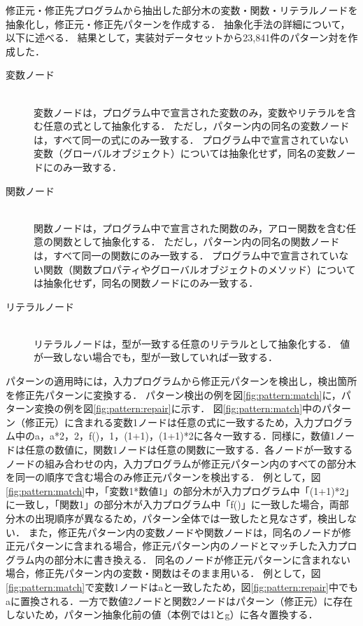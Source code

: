 \documentclass[11pt]{jreport}
\newcommand{\fixtwo}[1]{#1}
\begin{document}
修正元・修正先プログラムから抽出した部分木の変数・関数・リテラルノードを抽象化し，修正元・修正先パターンを作成する．
抽象化手法の詳細について，以下に述べる．
結果として，実装対データセットから23,841件のパターン対を作成した．


\begin{description}

\item[変数ノード]\mbox{}\\
変数ノードは，\fixtwo{プログラム中で宣言された変数のみ，}変数やリテラルを含む任意の式として抽象化する．
ただし，パターン内の同名の変数ノードは，すべて同一の式にのみ一致する．
\fixtwo{プログラム中で宣言されていない変数（グローバルオブジェクト）については抽象化せず，同名の変数ノードにのみ一致する．}

\item[関数ノード]\mbox{}\\
関数ノードは，\fixtwo{プログラム中で宣言された関数のみ，}アロー関数を含む任意の関数として抽象化する．
ただし，パターン内の同名の関数ノードは，すべて同一の関数にのみ一致する．
\fixtwo{プログラム中で宣言されていない関数（関数プロパティやグローバルオブジェクトのメソッド）については抽象化せず，同名の関数ノードにのみ一致する．}

\item[リテラルノード]\mbox{}\\
リテラルノードは，型が一致する任意のリテラルとして抽象化する．
値が一致しない場合でも，型が一致していれば一致する．

\end{description}


パターンの適用時には，入力プログラムから修正元パターンを検出し，検出箇所を修正先パターンに変換する．
パターン検出の例を図\ref{fig:pattern:match}に，パターン変換の例を図\ref{fig:pattern:repair}に示す．
\fixtwo{図\ref{fig:pattern:match}中のパターン（修正元）に含まれる変数1ノードは任意の式に一致するため，入力プログラム中のa，a*2，2，f()，1，(1+1)，(1+1)*2に各々一致する．同様に，数値1ノードは任意の数値に，関数1ノードは任意の関数に一致する．各ノードが一致するノードの組み合わせの内，}入力プログラムが修正元パターン内のすべての部分木を同一の順序で含む場合のみ修正元パターンを検出する．
\fixtwo{例として，図\ref{fig:pattern:match}中，「変数1*数値1」の部分木が入力プログラム中「(1+1)*2」に一致し，「関数1」の部分木が入力プログラム中「f()」に一致した場合，両部分木の出現順序が異なるため，パターン全体では一致したと見なさず，検出しない．}
また，修正先パターン内の変数ノードや関数ノードは，同名のノードが修正元パターンに含まれる場合，修正元パターン内のノードとマッチした入力プログラム内の部分木に書き換える．
同名のノードが修正元パターンに含まれない場合，修正先パターン内の変数・関数はそのまま用いる．
\fixtwo{例として，図\ref{fig:pattern:match}で変数1ノードはaと一致したため，図\ref{fig:pattern:repair}中でもaに置換される．一方で数値2ノードと関数2ノードはパターン（修正元）に存在しないため，パターン抽象化前の値（本例では1とg）に各々置換する．
}
\end{document}
